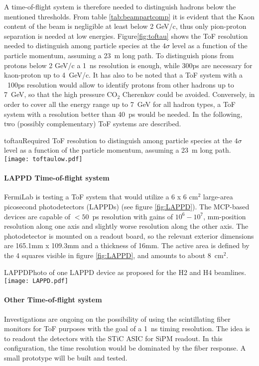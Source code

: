 A time-of-flight system  is therefore needed to distinguish hadrons below the mentioned thresholds.  From table \ref{tab:beampartcomp} it is evident that the Kaon content of the beam is negligible at least below 2 GeV/c, thus  only pion-proton separation is needed at low energies. Figure\ref{fig:toftau} shows the ToF resolution needed to distinguish among particle species at the $4\sigma$ level as a function of the particle momentum, assuming a 23~m long path. To distinguish pions from protons below 2 GeV/c a 1~ns resolution is enough, while 300ps are necessary for kaon-proton up to  4~GeV/c. It has also to be noted that a ToF system with a ~100ps resolution would allow to identify protons from other hadrons up to 7~GeV, so that the high pressure CO$_2$ Cherenkov could be avoided. Conversely, in order to cover all the energy range up to 7~GeV for all hadron  types, a ToF system with a resolution better than 40~ps would be needed.
In the following, two (possibly complementary) ToF systems are described.
\begin{cdrfigure}{toftau}{Required ToF resolution to  distinguish among particle species at the $4\sigma$ level as a function of the particle momentum, assuming a 23~m long path. }
\texttt{[image: toftaulow.pdf]}
\end{cdrfigure}

\paragraph{LAPPD Time-of-flight system}
FermiLab is testing a ToF system that would utilize a 6 x 6 cm$^2$
large-area picosecond photodetectors (LAPPDs) (see figure \ref{fig:LAPPD}).
 The MCP-based devices
are capable of $< 50$~ps resolution with gains of $10^6-10^7$,
mm-position resolution along one axis and slightly worse resolution
along the other axis.  The photodetector is mounted on a readout
board, so the relevant exterior dimensions are 165.1mm x 109.3mm and a
thickness of 16mm. The active area is defined by the 4 squares visible in figure \ref{fig:LAPPD}, and amounts to about 8~cm$^2$.
\begin{cdrfigure}[LAPPD]{LAPPD}{Photo of one LAPPD device as proposed for the H2 and H4 beamlines.}
\texttt{[image: LAPPD.pdf]}
\end{cdrfigure}

\paragraph{Other Time-of-flight system}
Investigations are ongoing on the possibility of using the  scintillating fiber monitors for ToF purposes with the goal of a 1~ns timing resolution. The idea is to readout the detectors with the STiC ASIC  for SiPM readout.
In this configuration, the time resolution would be dominated by the fiber response. A small prototype will be built and tested.

